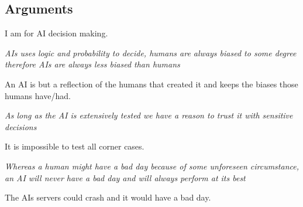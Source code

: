 \documentclass[11pt,a4paper]{article}
\begin{document}
\subsection{Arguments}
I am for AI decision making.

\textit{AIs uses logic and probability to decide, humans are always biased to some degree therefore AIs are always less biased than humans}

An AI is but a reflection of the humans that created it and keeps the biases those humans have/had.

\textit{As long as the AI is extensively tested we have a reason to trust it with sensitive decisions}

It is impossible to test all corner cases.

\textit{Whereas a human might have a bad day because of some unforeseen circumstance, an AI will never have a bad day and will always perform at its best}

The AIs servers could crash and it would have a bad day.



\end{document}
